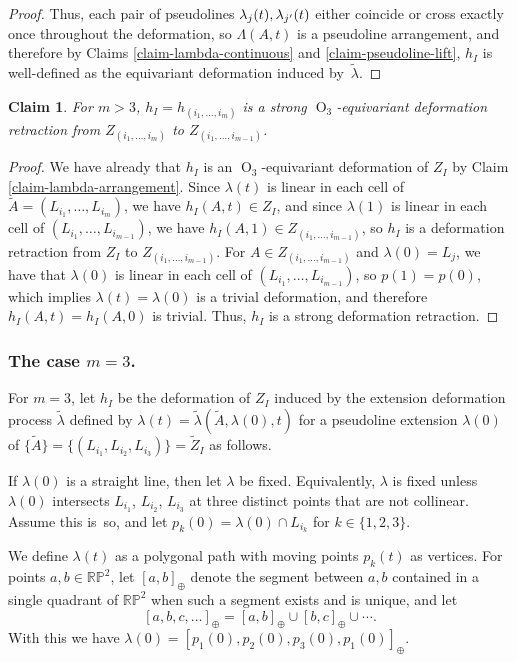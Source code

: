 \documentclass[11pt]{article}
\numberwithin{equation}{section}
\newtheorem{claim}[theorem]{Claim}
\theoremstyle{remark}
\let\mb\mathbb
\DeclareMathOperator{\orth}{O}
\newcommand{\projplane}{\mb{RP}^2}
\begin{document}
\begin{proof}
Thus, each pair of pseudolines $\lambda_j(t),\lambda_{j'}(t)$ either coincide or cross exactly once throughout the deformation, so $\Lambda(A,t)$ is a pseudoline arrangement, and therefore by Claims \ref{claim-lambda-continuous} and \ref{claim-pseudoline-lift}, $h_I$ is well-defined as the equivariant deformation induced by~$\tilde\lambda$.
\end{proof}

\begin{claim}\label{claim-deform-h}
For $m >3$, $h_I = h_{(i_1,\dots,i_m)}$ is a strong $\orth_3$-equivariant deformation retraction from $Z_{(i_1,\dots,i_m)}$ to $Z_{(i_1,\dots,i_{m-1})}$.
\end{claim}

\begin{proof}
We have already that $h_I$ is an $\orth_3$-equivariant deformation of $Z_I$ by Claim \ref{claim-lambda-arrangement}.
Since $\lambda(t)$ is linear in each cell of $\tilde A = (L_{i_1},\dots,L_{i_{m}})$, we have $h_I(A,t) \in Z_I$,
and since $\lambda(1)$ is linear in each cell of $(L_{i_1},\dots,L_{i_{m-1}})$, we have $h_I(A,1) \in Z_{(i_1,\dots,i_{m-1})}$,
so $h_I$ is a deformation retraction from $Z_I$ to $Z_{(i_1,\dots,i_{m-1})}$.
For $A \in Z_{(i_1,\dots,i_{m-1})}$ and $\lambda(0) = L_j$, we have that $\lambda(0)$ is linear in each cell of $(L_{i_1},\dots,L_{i_{m-1}})$, so $p(1) = p(0)$, which implies $\lambda(t) = \lambda(0)$ is a trivial deformation, and therefore $h_I(A,t) = h_I(A,0)$ is trivial. Thus, $h_I$ is a strong deformation retraction.
\end{proof}

\subsubsection*{The case $m=3$.}
For $m=3$, let $h_I$ be the deformation of $Z_I$ induced by the extension deformation process $\tilde \lambda$ defined by $\lambda(t) = \tilde \lambda(\tilde A, \lambda(0), t)$
for a pseudoline extension $\lambda(0)$ of $\{\tilde A\} = \{(L_{i_1},L_{i_2},L_{i_3})\} = \tilde Z_{I}$ as follows.

If $\lambda(0)$ is a straight line,
then let $\lambda$ be fixed.
Equivalently, $\lambda$ is fixed unless $\lambda(0)$ intersects $L_{i_1}$, $L_{i_2}$, $L_{i_3}$ at three distinct points that are not collinear.
Assume this is~so, and let $p_k(0) = \lambda(0) \cap L_{i_k}$ for $k \in \{1,2,3\}$.

We define $\lambda(t)$ as a polygonal path with moving points $p_k(t)$ as vertices.
For points $a,b \in \projplane$, let $[a,b]_\oplus$ denote the segment between $a,b$ contained in a single quadrant of $\projplane$ when such a segment exists and is unique, and let
\[
[a,b,c,\dots]_\oplus = [a,b]_\oplus \cup [b,c]_\oplus \cup \cdots.
\]
With this we have $\lambda(0) = [p_1(0),p_2(0),p_3(0),p_1(0)]_{\oplus}$.
\end{document}
